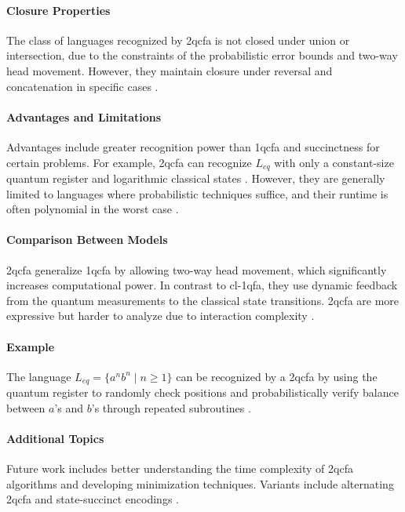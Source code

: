 \paragraph{Closure Properties}  
The class of languages recognized by \gls{2qcfa} is not closed under union or intersection, due to the constraints of the probabilistic error bounds and two-way head movement. However, they maintain closure under reversal and concatenation in specific cases \cite{li2015hybrid}.

\paragraph{Advantages and Limitations}  
Advantages include greater recognition power than \gls{1qcfa} and succinctness for certain problems. For example, \gls{2qcfa} can recognize $L_{eq}$ with only a constant-size quantum register and logarithmic classical states \cite{remscrim2020power}. However, they are generally limited to languages where probabilistic techniques suffice, and their runtime is often polynomial in the worst case \cite{remscrim2020lower}.

\paragraph{Comparison Between Models}  
\gls{2qcfa} generalize \gls{1qcfa} by allowing two-way head movement, which significantly increases computational power. In contrast to \gls{cl-1qfa}, they use dynamic feedback from the quantum measurements to the classical state transitions. \gls{2qcfa} are more expressive but harder to analyze due to interaction complexity \cite{zheng2013state}.

\paragraph{Example}  
The language $L_{eq} = \{ a^n b^n \mid n \geq 1 \}$ can be recognized by a \gls{2qcfa} by using the quantum register to randomly check positions and probabilistically verify balance between $a$'s and $b$'s through repeated subroutines \cite{ambainis2002two}.

\paragraph{Additional Topics}  
Future work includes better understanding the time complexity of \gls{2qcfa} algorithms and developing minimization techniques. Variants include alternating \gls{2qcfa} and state-succinct encodings \cite{zheng2013state, remscrim2020lower}.


